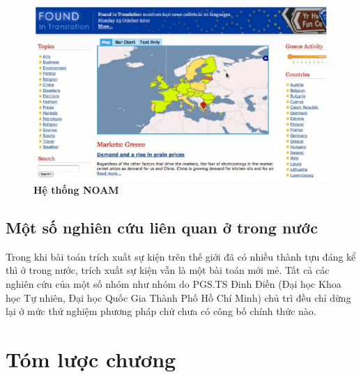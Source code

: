 \begin{figure}[htbp]
		\centering
		\includegraphics[width=1\textwidth]{noam}
		\caption{\textbf{Hệ thống NOAM}}
		\label{fig:noam}
\end{figure}





	\subsection{Một số nghiên cứu liên quan ở trong nước}
\noindent Trong khi bài toán trích xuất sự kiện trên thế giới đã có nhiều thành tựu đáng kể thì ở trong nước, trích xuất sự kiện vẫn là một bài toán mới mẻ. Tất cả các nghiên cứu của một số nhóm như nhóm do PGS.TS Đinh Điền (Đại học Khoa học Tự nhiên, Đại học Quốc Gia Thành Phố Hồ Chí Minh) chủ trì  đều chỉ dừng lại ở mức thử nghiệm phương pháp chứ chưa có công bố chính thức nào.
    \section{Tóm lược chương}


